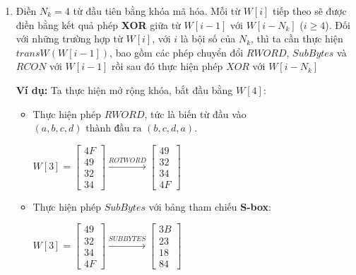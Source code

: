 \begin{enumerate}[label= \textbf{Bước \arabic*:}]
	\item Điền $N_k = 4$ từ đầu tiên bằng khóa mã hóa. Mỗi từ $W[i]$ tiếp theo sẽ được điền bằng kết quả phép \textbf{XOR} giữa từ $W[i-1]$ với $W[i-N_k]$ ($i \geq 4$). Đối với những trường hợp từ $W[i]$, với $i$ là bội số của $N_k$, thì ta cần thực hiện $transW(W[i-1])$, bao gồm các phép chuyển đổi $RWORD$, $SubBytes$ và $RCON$ với $W[i-1]$ rồi sau đó thực hiện phép $XOR$ với $W[i-N_k]$
	
	\textbf{Ví dụ:}  Ta thực hiện mở rộng khóa, bắt đầu bằng $W[4]$:
	\begin{itemize}
		\item Thực hiện phép $RWORD$, tức là biến từ đầu vào $(a,b,c,d) \text{ thành đầu ra }(b,c,d,a).$
		\begin{center}
			$
			W[3] = 	\begin{bmatrix} 4F \\49 \\32 \\34 \end{bmatrix}
			\xrightarrow{ROTWORD}
			\begin{bmatrix}	49 \\32 \\34 \\4F \end{bmatrix}
			$
		\end{center}
		
		\item Thực hiện phép $SubBytes$ với bảng tham chiếu \textbf{S-box}:
		\begin{center}
			$
			W[3] = \begin{bmatrix}	49 \\32 \\34 \\4F \end{bmatrix}
			\xrightarrow{SUBBYTES}
			\begin{bmatrix}	3B \\ 23 \\18\\84 \end{bmatrix}
			$
		\end{center}
		

\end{itemize}
\end{enumerate}
